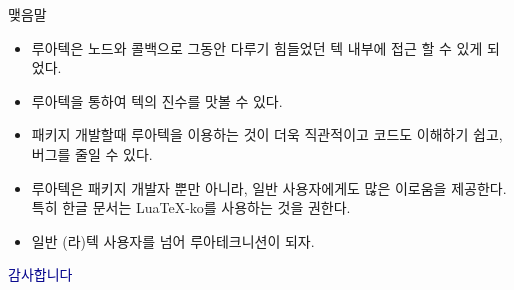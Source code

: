 \documentclass[t,10pt]{beamer}
\begin{document}
\begin{frame}{맺음말}
  \begin{itemize}
  \item 루아텍은 노드와 콜백으로 그동안 다루기 힘들었던 텍 내부에 접근 할 수
    있게 되었다.
  \item 루아텍을 통하여 텍의 진수를 맛볼  수 있다.
  \item 패키지 개발할때 루아텍을 이용하는 것이 더욱 직관적이고 코드도 이해하기
    쉽고, 버그를 줄일 수 있다.
  \item 루아텍은 패키지 개발자 뿐만 아니라, 일반 사용자에게도 많은 이로움을
    제공한다. 특히 한글 문서는 Lua\TeX-ko를 사용하는 것을 권한다.
  \item 일반 (라)텍 사용자를 넘어 루아테크니션이 되자.
  \end{itemize}
\end{frame}

{
  \begin{frame}[standout]
    \LARGE\textcolor{DarkBlue}{감사합니다}
  \end{frame}
}
\end{document}
